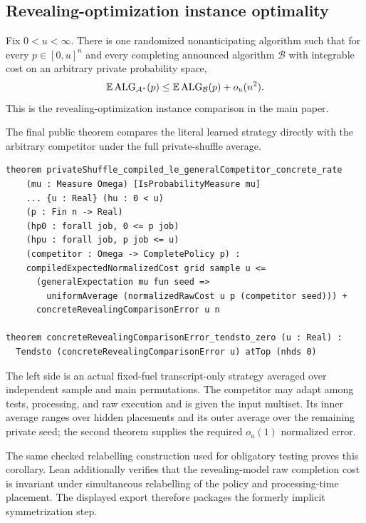 \subsection{Revealing-optimization instance optimality}

\begin{theorem}
\label{thm:lean-audit-revealing-instance}
Fix $0<u<\infty$.  There is one randomized nonanticipating algorithm such that
for every $p\in[0,u]^n$ and every completing announced algorithm
$\mathcal B$ with integrable cost on an arbitrary private probability space,
\[
 \mathbb{E}\operatorname{ALG}_{\mathcal A^*}(p)
 \le \mathbb{E}\operatorname{ALG}_{\mathcal B}(p)+o_u(n^2).
\]
This is the revealing-optimization instance comparison in the main paper.
\end{theorem}

The final public theorem compares the literal learned strategy directly with
the arbitrary competitor under the full private-shuffle average.

\begin{lstlisting}[style=lean]
theorem privateShuffle_compiled_le_generalCompetitor_concrete_rate
    (mu : Measure Omega) [IsProbabilityMeasure mu]
    ... {u : Real} (hu : 0 < u)
    (p : Fin n -> Real)
    (hp0 : forall job, 0 <= p job)
    (hpu : forall job, p job <= u)
    (competitor : Omega -> CompletePolicy p) :
    compiledExpectedNormalizedCost grid sample u <=
      (generalExpectation mu fun seed =>
        uniformAverage (normalizedRawCost u p (competitor seed))) +
      concreteRevealingComparisonError u n

theorem concreteRevealingComparisonError_tendsto_zero (u : Real) :
  Tendsto (concreteRevealingComparisonError u) atTop (nhds 0)
\end{lstlisting}

The left side is an actual fixed-fuel transcript-only strategy averaged over
independent sample and main permutations.  The competitor may adapt among
tests, processing, and raw execution and is given the input multiset.  Its
inner average ranges over hidden placements and its outer average over the
remaining private seed; the second theorem supplies the required $o_u(1)$
normalized error.

The same checked relabelling construction used for obligatory testing proves
this corollary.  Lean additionally verifies that the revealing-model raw
completion cost is invariant under simultaneous relabelling of the policy
and processing-time placement.  The displayed export therefore packages the
formerly implicit symmetrization step.

